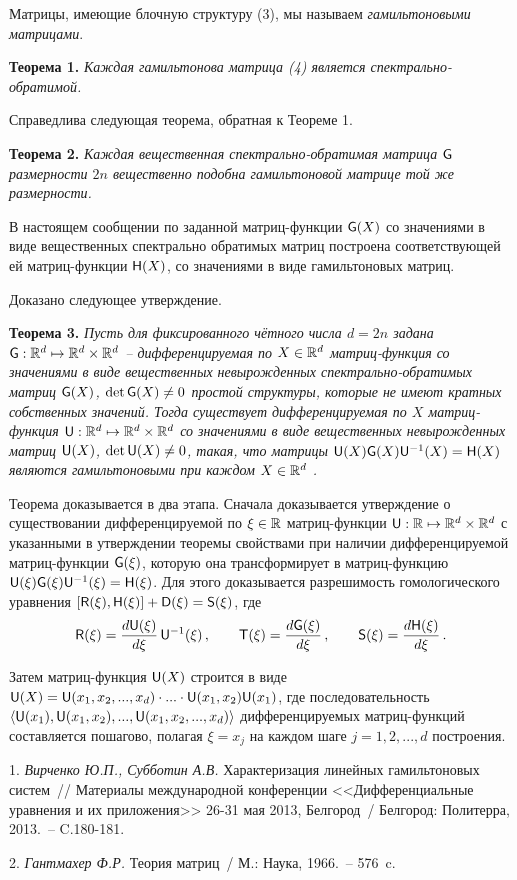 Матрицы, имеющие блочную структуру (3), мы называем {\it гамильтоновыми матрицами}.

\textbf{Теорема 1.} {\it Каждая гамильтонова матрица (4) является спектрально-обратимой.}
\smallskip

Справедлива следующая теорема, обратная к Теореме 1.
\smallskip

\textbf{Теорема 2.} {\it Каждая вещественная спектрально-обратимая матрица ${\sf G}$ размерности $2n$ вещественно подобна гамильтоновой матрице той же размерности.}
\smallskip

В настоящем сообщении  по заданной матриц-функ\-ции ${\sf G}(X)$ со значениями в виде вещественных спектрально обратимых матриц построена соответствующей ей  матриц-функции ${\sf H}(X)$, со значениями в виде  гамильтоновых матриц.

Доказано следующее утверждение.
\smallskip

\textbf{Теорема 3.} {\it Пусть для фиксированного чётного числа $d  = 2n$ задана ${\sf G}: {\Bbb R}^d \mapsto {\Bbb R}^d\times {\Bbb R}^d$ -- дифференцируемая по $X \in {\Bbb R}^d$ матриц-фун\-к\-ция со значениями в виде вещественных  невырожденных спектрально-обратимых матриц  ${\sf G}(X)$, $\det {\sf G}(X) \ne 0$ простой структуры, которые не имеют кратных собственных значений. Тогда существует дифференцируемая по $X$ матриц-фун\-к\-ция ${\sf U}: {\Bbb R}^{d} \mapsto {\Bbb R}^d \times {\Bbb R}^d$ со значениями в виде вещественных невырожденных матриц ${\sf U}(X)$,  $\det {\sf U}(X) \ne 0$, такая, что матрицы ${\sf U}(X){\sf  G}(X){\sf U}^{-1}(X) =  {\sf H} (X)$ являются гамильтоновыми при каждом $X \in {\Bbb R}^d$ .}
\smallskip

Теорема доказывается в два этапа. Сначала  доказывается утверждение о существовании дифференцируемой  по $\xi \in {\Bbb R}$ матриц-функции ${\sf U}: {\Bbb R} \mapsto {\Bbb R}^d \times {\Bbb R}^d$ с указанными в утверждении теоремы свойствами при наличии дифференцируемой матриц-функции ${\sf G}(\xi)$, которую она трансформирует в матриц-функцию  ${\sf U}(\xi){\sf  G}(\xi){\sf U}^{-1}(\xi) =  {\sf H} (\xi)$. Для этого доказывается разрешимость гомологического уравнения $[{\sf R}(\xi), {\sf H}(\xi)] + {\sf D}(\xi) = {\sf S}(\xi)$, где
$${\sf R}(\xi) = \frac {d {\sf U}(\xi)}{d \xi}\,{\sf U}^{-1}(\xi) \,, \qquad {\sf T}(\xi) = \frac {d {\sf G}(\xi)}{d \xi}\,, \qquad {\sf S}(\xi) = \frac {d {\sf H}(\xi)}{d \xi}\,. $$

Затем матриц-функция ${\sf U}(X)$ строится в виде ${\sf U}(X) = {\sf U}(x_1, x_2, ..., x_d) \cdot ... \cdot {\sf U}(x_1, x_2) {\sf U}(x_1)$, где последовательность $\langle {\sf U}(x_1), {\sf U}(x_1, x_2), ..., {\sf U}(x_1, x_2, ..., x_d)\rangle$  дифференцируемых  мат\-риц-функций  составляется пошагово, полагая $\xi = x_j$ на каждом шаге $j = 1, 2, ..., d$ построения.
\smallskip

\litlist

1. {\it Вирченко Ю.П., Субботин А.В.}  Характеризация линейных гамильтоновых систем~// Материалы международной конференции <<Дифференциальные уравнения и их приложения>> 26-31 мая 2013, Белгород~/ Белгород: Политерра, 2013.~-- C.180-181.

2. {\it Гантмахер Ф.Р.} Теория матриц~/ М.: Наука, 1966.~-- 576~c.





